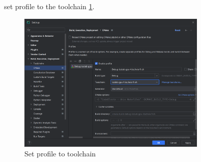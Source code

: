 set profile to the toolchain \ref{fig:analyze:gpu:cuda:profile}.

\begin{figure}[ht]
    \centering
    \includegraphics[width=0.8\textwidth]{05-resources/img/analyze/cmake-profile.png}
    \caption{Set profile to toolchain}
    \label{fig:analyze:gpu:cuda:profile}
\end{figure}
